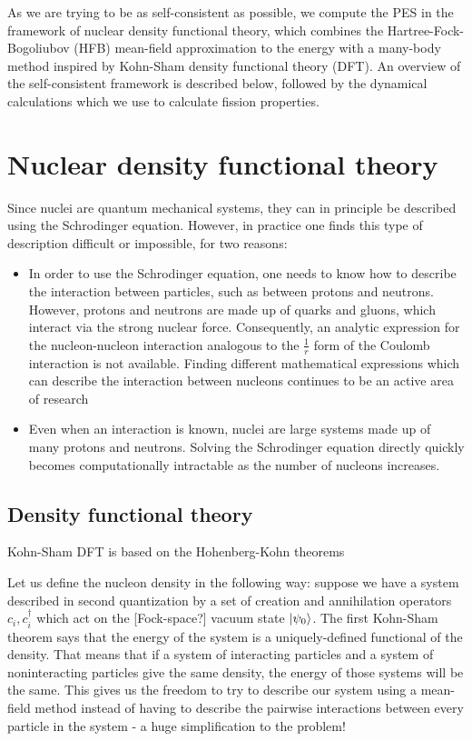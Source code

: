 As we are trying to be as self-consistent as possible, we compute the PES in the framework of nuclear density functional theory, which combines the Hartree-Fock-Bogoliubov (HFB) mean-field approximation to the energy with a many-body method inspired by Kohn-Sham density functional theory (DFT). An overview of the self-consistent framework is described below, followed by the dynamical calculations which we use to calculate fission properties.

\section{Nuclear density functional theory}
Since nuclei are quantum mechanical systems, they can in principle be described using the Schrodinger equation. However, in practice one finds this type of description difficult or impossible, for two reasons:

\begin{itemize}
\item In order to use the Schrodinger equation, one needs to know how to describe the interaction between particles, such as between protons and neutrons. However, protons and neutrons are made up of quarks and gluons, which interact via the strong nuclear force. Consequently, an analytic expression for the nucleon-nucleon interaction analogous to the $\frac{1}{r}$ form of the Coulomb interaction is not available. Finding different mathematical expressions which can describe the interaction between nucleons continues to be an active area of research \cite{lots of papers}
\item Even when an interaction is known, nuclei are large systems made up of many protons and neutrons. Solving the Schrodinger equation directly quickly becomes computationally intractable as the number of nucleons increases.
\end{itemize}

\subsection{Density functional theory}\label{sect:DFT}
Kohn-Sham DFT is based on the Hohenberg-Kohn theorems

Let us define the nucleon density in the following way: suppose we have a system described in second quantization by a set of creation and annihilation operators $c_i, c_i^\dagger$ which act on the [Fock-space?] vacuum state $\ket{\psi_0}$. The first Kohn-Sham theorem says that the energy of the system is a uniquely-defined functional of the density. That means that if a system of interacting particles and a system of noninteracting particles give the same density, the energy of those systems will be the same. This gives us the freedom to try to describe our system using a mean-field method instead of having to describe the pairwise interactions between every particle in the system - a huge simplification to the problem!

